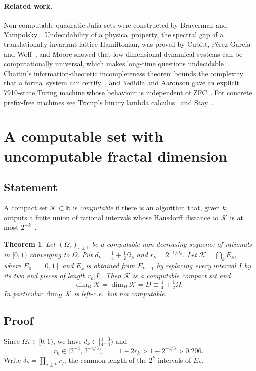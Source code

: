 \documentclass[11pt]{article}
\newtheorem{theorem}{Theorem}
\theoremstyle{definition}\newtheorem{definition}{Definition}[section]
\theoremstyle{remark}\newtheorem*{remark}{Remark}
\begin{document}
\paragraph{Related work.} Non-computable quadratic Julia sets were constructed by Braverman and
Yampolsky~\cite{BY}. Undecidability of a physical property, the spectral gap of a translationally invariant
lattice Hamiltonian, was proved by Cubitt, P\'erez-Garc\'ia and Wolf~\cite{CPW}, and Moore showed that
low-dimensional dynamical systems can be computationally universal, which makes long-time questions
undecidable~\cite{Moore}. Chaitin's information-theoretic incompleteness theorem bounds the complexity that a
formal system can certify~\cite{Chaitin74}, and Yedidia and Aaronson gave an explicit 7910-state Turing
machine whose behaviour is independent of ZFC~\cite{YA}. For concrete prefix-free machines see Tromp's binary
lambda calculus~\cite{Tromp} and Stay~\cite{Stay}.

\section{A computable set with uncomputable fractal dimension}
\label{sec:construction}

\subsection{Statement}
A compact set $\mathcal K\subset\mathbb R$ is \emph{computable} if there is an algorithm that, given $k$, outputs a
finite union of rational intervals whose Hausdorff distance to $\mathcal K$ is at most $2^{-k}$~\cite{Weihrauch}.

\begin{theorem}
\label{thm:main}
Let $(\Omega_s)_{s\ge1}$ be a computable non-decreasing sequence of rationals in $[0,1)$ converging to $\Omega$.
Put $d_k=\frac14+\frac12\Omega_k$ and $r_k=2^{-1/d_k}$. Let $\mathcal K=\bigcap_kE_k$, where $E_0=[0,1]$ and $E_k$ is obtained
from $E_{k-1}$ by replacing every interval $I$ by its two end pieces of length $r_k|I|$. Then $\mathcal K$ is a computable
compact set and
\begin{equation}
\dim_B\mathcal K=\dim_H\mathcal K=D\equiv\tfrac14+\tfrac12\Omega .
\end{equation}
In particular $\dim_H\mathcal K$ is left-c.e.\ but not computable.
\end{theorem}

\subsection{Proof}
Since $\Omega_k\in[0,1)$, we have $d_k\in[\frac14,\frac34)$ and
\begin{equation}
r_k\in\big[2^{-4},\,2^{-4/3}\big),\qquad 1-2r_k>1-2^{-1/3}>0.206 .
\label{eq:bounds}
\end{equation}
Write $\delta_k=\prod_{j\le k}r_j$, the common length of the $2^k$ intervals of $E_k$.
\end{document}
